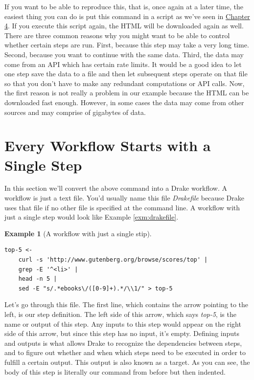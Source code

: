 \documentclass[
]{book}
\theoremstyle{definition}
\theoremstyle{definition}
\newtheorem{example}{Example}[chapter]
\theoremstyle{definition}
\theoremstyle{remark}
\begin{document}
If you want to be able to reproduce this, that is, once again at a later time, the easiest thing you can do is put this command in a script as we've seen in \protect\hyperlink{chapter-4-creating-reusable-command-line-tools}{Chapter 4}. If you execute this script again, the HTML will be downloaded again as well. There are three common reasons why you might want to be able to control whether certain steps are run. First, because this step may take a very long time. Second, because you want to continue with the same data. Third, the data may come from an API which has certain rate limits. It would be a good idea to let one step save the data to a file and then let subsequent steps operate on that file so that you don't have to make any redundant computations or API calls. Now, the first reason is not really a problem in our example because the HTML can be downloaded fast enough. However, in some cases the data may come from other sources and may comprise of gigabytes of data.

\hypertarget{every-workflow-starts-with-a-single-step}{%
\section{Every Workflow Starts with a Single Step}\label{every-workflow-starts-with-a-single-step}}

In this section we'll convert the above command into a Drake workflow. A workflow is just a text file. You'd usually name this file \emph{Drakefile} because Drake uses that file if no other file is specified at the command line. A workflow with just a single step would look like Example \ref{exm:drakefile}.

\begin{example}[A workflow with just a single stip]
\protect\hypertarget{exm:drakefile}{}{\label{exm:drakefile} {} }
\end{example}

\begin{verbatim}
top-5 <-                                                    
    curl -s 'http://www.gutenberg.org/browse/scores/top' |  
    grep -E '^<li>' |                                       
    head -n 5 |                                             
    sed -E "s/.*ebooks\/([0-9]+).*/\\1/" > top-5            
\end{verbatim}

Let's go through this file. The first line, which contains the arrow pointing to the left, is our step definition. The left side of this arrow, which says \emph{top-5}, is the name or output of this step. Any inputs to this step would appear on the right side of this arrow, but since this step has no input, it's empty. Defining inputs and outputs is what allows Drake to recognize the dependencies between steps, and to figure out whether and when which steps need to be executed in order to fulfill a certain output. This output is also known as a target. As you can see, the body of this step is literally our command from before but then indented.
\end{document}
